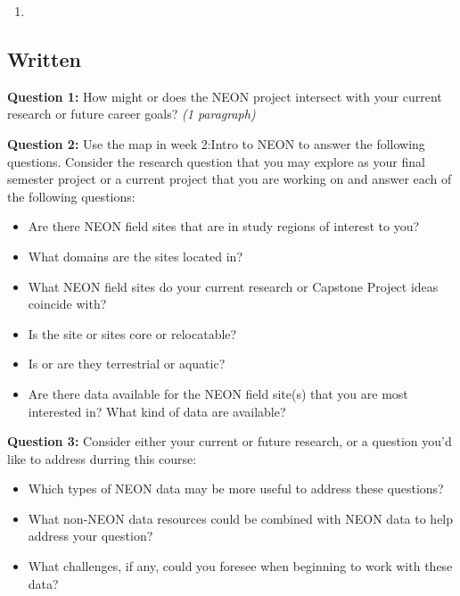 \documentclass[]{book}
\providecommand{\tightlist}{%
  \setlength{\itemsep}{0pt}\setlength{\parskip}{0pt}}
\begin{document}
\begin{enumerate}
\def\labelenumi{\arabic{enumi}.}
\item
\end{enumerate}

\hypertarget{ds-challenge}{}
\hypertarget{written}{%
\subsection{Written}\label{written}}

\textbf{Question 1:} How might or does the NEON project
intersect with your current research or future career goals? \emph{(1 paragraph)}

\leavevmode\hypertarget{ds-challenge}{}%
\textbf{Question 2:}
Use the map in week 2:Intro to NEON to answer the following questions. Consider the research question that you may explore as your final semester project or a current project that you are working on and answer each of the following questions:

\begin{itemize}
\tightlist
\item
  Are there NEON field sites that are in study regions of interest to you?\\
\item
  What domains are the sites located in?\\
\item
  What NEON field sites do your current research or Capstone Project ideas
  coincide with?\\
\item
  Is the site or sites core or relocatable?\\
\item
  Is or are they terrestrial or aquatic?\\
\item
  Are there data available for the NEON field site(s) that you are most
  interested in? What kind of data are available?
\end{itemize}

\leavevmode\hypertarget{ds-challenge}{}%
\textbf{Question 3:}
Consider either your current or future research, or a question you'd like to
address durring this course:

\begin{itemize}
\tightlist
\item
  Which types of NEON data may be more useful to address these questions?
\item
  What non-NEON data resources could be combined with NEON data to help address your question?
\item
  What challenges, if any, could you foresee when beginning to work with these
  data?
\end{itemize}
\end{document}
